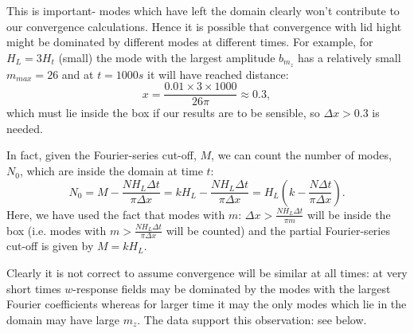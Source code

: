 \documentclass[12pt]{article}
\begin{document}
This is important- modes which have left the domain clearly won't contribute to our convergence calculations. 
Hence it is possible that convergence with lid hight might be dominated by different modes at different times. 
For example, for $H_L = 3 H_t$ (small) the mode with the largest amplitude $b_{m_z}$ has a relatively small $m_{max}= 26$ 
and at $t=1000s$ it will have reached distance:
% 
\begin{equation}
x = \frac{0.01 \times 3 \times 1000 }{ 26 \pi } \approx 0.3,
\end{equation}
%
which must lie inside the box if our results are to be sensible, so $\Delta x > 0.3$ is needed.

In fact, given the Fourier-series cut-off, $M$, we can count the number of modes, $N_0$, which are inside the domain at time $t$:
%
\begin{equation}
N_0 = M - \frac{NH_L \Delta t }{\pi \Delta x} = kH_L -   \frac{NH_L \Delta t }{\pi \Delta x} = H_L \left( k - \frac{N \Delta t }{\pi \Delta x} \right).
\end{equation}
%
Here, we have used the fact that modes with $m$: $\Delta x > \frac{N H_L \Delta t}{ \pi m}$ will be inside the box (i.e. modes with
$m>\frac{NH_L \Delta t }{\pi \Delta x}$ will be counted) and the partial Fourier-series cut-off is given by $M = k H_L$.

Clearly it is not correct to assume convergence will be similar at all times: at very short times $w$-response fields may be 
dominated by the modes with the largest Fourier coefficients whereas for larger time 
it may the only modes which lie in the domain may have large $m_z$. The data support this observation: see below.
%
%
%
\end{document}
